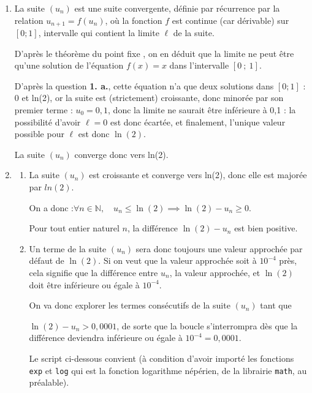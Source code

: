 \documentclass[10pt]{article}
\providecommand{\N}{\mathbb{N}}
\begin{document}
\begin{enumerate}
\begin{enumerate}
La suite étant croissante et majorée, on en déduit qu'elle est donc convergente, vers une limite $\ell$ vérifiant $0 \leqslant \ell \leqslant 1$.
		\end{enumerate}

		\item La suite $(u_n)$ est une suite convergente, définie par récurrence par la relation $u_{n+1} = f(u_n)$, où la fonction $f$ est continue (car dérivable) sur $ [0 ; 1] $, intervalle qui contient la limite $\ell$ de la suite.

D'après le théorème \og du point fixe \fg{}, on en déduit que la limite ne peut être qu'une solution de l'équation $f(x) = x$ dans l'intervalle $ [0~;~1] $.

D'après la question \textbf{1. a.}, cette équation n'a que deux solutions dans $ [0 ; 1] $ : 0 et ln(2), or la suite est (strictement) croissante, donc minorée par son premier terme : $u_0 = 0,1$, donc la limite ne saurait être inférieure à 0,1 : la possibilité d'avoir $\ell = 0$ est donc écartée, et finalement, l'unique valeur possible pour $\ell$ est donc $\ln(2)$.

La suite $(u_n)$ converge donc vers ln(2).

	\item \begin{enumerate}
		\item La suite $\left(u_n\right) $ est croissante et converge vers ln(2), donc elle est majorée par $ln (2)$.

On a donc :\quad $\forall n \in \N, \quad u_n \leqslant \ln(2) \implies \ln(2) - u_n \geqslant 0$.

Pour tout entier naturel $n$, la différence $\ln(2) - u_n$ est bien positive.

		\item Un terme de la suite $(u_n)$ sera donc toujours une valeur approchée par défaut de $\ln(2)$. Si on veut que la valeur approchée soit à $ 10^{-4} $ près, cela signifie que la différence entre $u_n$, la valeur approchée, et $\ln(2)$ doit être inférieure ou égale à $ 10^{-4} $.

On va donc explorer les termes consécutifs de la suite $(u_n)$ tant que 

$\ln(2) - u_n > 0,0001$, de sorte que la boucle s'interrompra dès que la différence deviendra inférieure ou égale à $ 10^{-4} = 0,0001 $.

Le script ci-dessous convient (à condition d'avoir importé les fonctions \texttt{exp} et \texttt{log} qui est la fonction logarithme népérien,  de la librairie \texttt{math}, au préalable).


\end{enumerate}
\end{enumerate}
\end{document}
